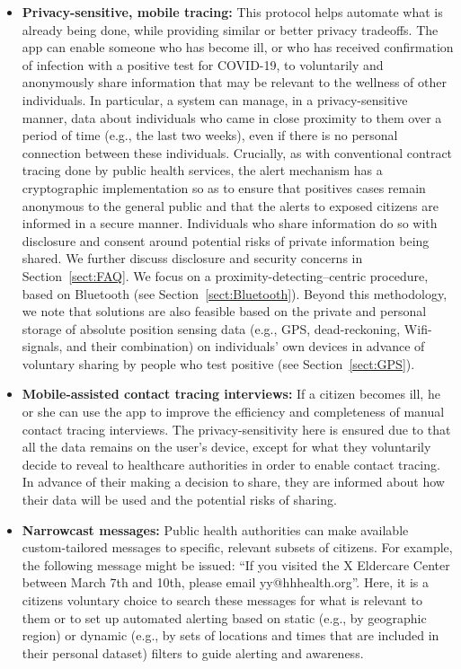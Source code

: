 \documentclass{article}
\begin{document}
\begin{itemize}
\item \textbf{Privacy-sensitive, mobile tracing:}  This protocol helps automate what is already being done, while providing similar or better privacy tradeoffs.
The app can enable someone who has become ill, or who has received confirmation of infection with a positive test for COVID-19, to voluntarily and anonymously share information that may be relevant to the wellness of other individuals.  In particular, a system can manage, in a privacy-sensitive manner, data about individuals who came in close proximity to them over a period of time (e.g., the last two weeks), even if there is no personal connection between these individuals.
Crucially, as with conventional contract tracing done by public health services, the alert mechanism has a cryptographic implementation so as to ensure that positives cases remain anonymous to the general public and that the alerts to exposed citizens are informed in a secure manner. Individuals who share information do so with disclosure and consent around potential risks of private information being shared. We further discuss disclosure and security concerns in Section~\ref{sect:FAQ}. We focus on a proximity-detecting--centric procedure, based on Bluetooth (see Section~\ref{sect:Bluetooth}). Beyond this methodology, we note that solutions are also feasible based on the private and personal storage of absolute position sensing data (e.g., GPS, dead-reckoning, Wifi-signals, and their combination) on individuals' own devices in advance of voluntary sharing by people who test positive (see Section~\ref{sect:GPS}).


\item \textbf{Mobile-assisted contact tracing interviews:}  If a citizen becomes ill, he or she can use the app to improve the efficiency and completeness of manual contact tracing interviews. The privacy-sensitivity here is ensured due to that all the data remains on the user's device, except for what they voluntarily decide to reveal to healthcare authorities in order to enable contact tracing. In advance of their making a decision to share, they are informed about how their data will be used and the potential risks of sharing.

\item \textbf{Narrowcast messages:}  Public health authorities can make available
  custom-tailored messages to specific, relevant subsets of citizens.  For example, the following message might be issued: ``If you visited
  the X Eldercare Center between March 7th and 10th, please email yy@hhhealth.org''.  Here, it is a citizens voluntary choice to search these messages for what is relevant to them or to set up automated alerting based on static (e.g., by geographic region) or dynamic (e.g., by sets of locations and times that are included in their personal dataset) filters to guide alerting and awareness.
  
\end{itemize}
\end{document}
